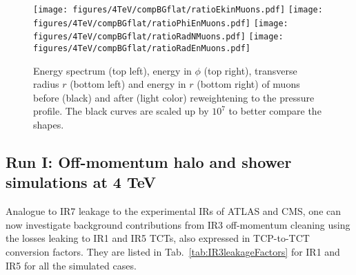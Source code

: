 \begin{figure}
\begin{center}
  \texttt{[image: figures/4TeV/compBGflat/ratioEkinMuons.pdf]}
  \texttt{[image: figures/4TeV/compBGflat/ratioPhiEnMuons.pdf]}
  \texttt{[image: figures/4TeV/compBGflat/ratioRadNMuons.pdf]}
  \texttt{[image: figures/4TeV/compBGflat/ratioRadEnMuons.pdf]}
\end{center}
\vspace{-0.6cm}
 \caption{Energy spectrum (top left), energy in $\phi$ (top right), transverse radius $r$ (bottom left) and energy in $r$ (bottom right) of muons before (black) and after (light color) reweightening to the pressure profile. The black curves are scaled up by $10^7$ to better compare the shapes. %
  \label{fig:cv81EkinPhiEn4TeV}} 
\end{figure}

\clearpage
\newpage
\subsection{Run I: Off-momentum halo and shower simulations at 4 TeV}

Analogue to IR7 leakage to the experimental IRs of ATLAS and CMS, one can now investigate background contributions from IR3 off-momentum cleaning using the losses leaking to IR1 and IR5 TCTs, also expressed in TCP-to-TCT conversion factors. They are listed in Tab.~\ref{tab:IR3leakageFactors} for IR1 and IR5 for all the simulated cases.

